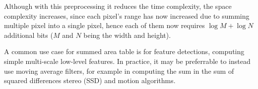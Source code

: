 \documentclass[twoside,a4paper,article]{combine}
\begin{document}
Although with this preprocessing it reduces the time complexity, the space complexity increases, since each pixel's range has now increased due to summing multiple pixel into a single pixel,
hence each of them now requires $\log M + \log N$ additional bits ($M$ and $N$ being the width and height)\cite{Szeliski_2022}.

A common use case for summed area table is for feature detections, computing simple multi-scale low-level features. In practice, it may be preferrable to instead use 
moving average filters, for example in computing the sum in the sum of squared differences stereo (SSD) and motion algorithms\cite{Szeliski_2022}.\footnotemark{}



\end{document}
